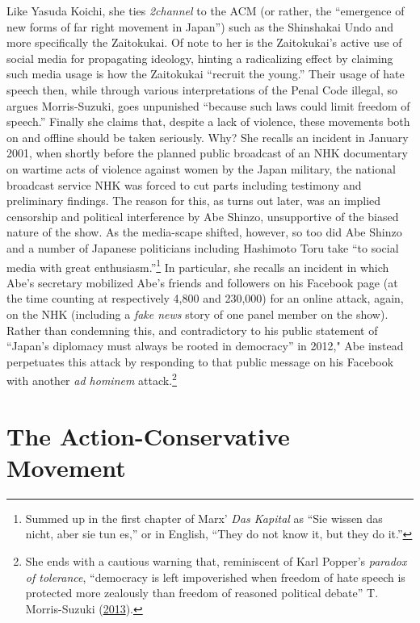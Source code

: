 \documentclass[10pt,british,A4paper,,openany]{memoir}
\begin{document}
Like Yasuda Koichi, she ties \emph{2channel} to the ACM (or rather, the
``emergence of new forms of far right movement in Japan'') such as the
Shinshakai Undo and more specifically the Zaitokukai. Of note to her is
the Zaitokukai's active use of social media for propagating ideology,
hinting a radicalizing effect by claiming such media usage is how the
Zaitokukai ``recruit the young.'' Their usage of hate speech then, while
through various interpretations of the Penal Code illegal, so argues
Morris-Suzuki, goes unpunished ``because such laws could limit freedom
of speech.'' Finally she claims that, despite a lack of violence, these
movements both on and offline should be taken seriously. Why? She
recalls an incident in January 2001, when shortly before the planned
public broadcast of an NHK documentary on wartime acts of violence
against women by the Japan military, the national broadcast service NHK
was forced to cut parts including testimony and preliminary findings.
The reason for this, as turns out later, was an implied censorship and
political interference by Abe Shinzo, unsupportive of the biased nature
of the show. As the media-scape shifted, however, so too did Abe Shinzo
and a number of Japanese politicians including Hashimoto Toru take ``to
social media with great enthusiasm.''\footnote{Summed up in the first
  chapter of Marx' \emph{Das Kapital} as ``Sie wissen das nicht, aber
  sie tun es,'' or in English, ``They do not know it, but they do it.''}
In particular, she recalls an incident in which Abe's secretary
mobilized Abe's friends and followers on his Facebook page (at the time
counting at respectively 4,800 and 230,000) for an online attack, again,
on the NHK (including a \emph{fake news} story of one panel member on
the show). Rather than condemning this, and contradictory to his public
statement of ``Japan's diplomacy must always be rooted in democracy'' in
2012," Abe instead perpetuates this attack by responding to that public
message on his Facebook with another \emph{ad hominem} attack.\footnote{She
  ends with a cautious warning that, reminiscent of Karl Popper's
  \emph{paradox of tolerance}, ``democracy is left impoverished when
  freedom of hate speech is protected more zealously than freedom of
  reasoned political debate'' T. Morris-Suzuki
  (\protect\hyperlink{ref-morris-suzuki_freedom_2013}{2013}).}

\section{The Action-Conservative
Movement}\label{the-action-conservative-movement}
\end{document}
